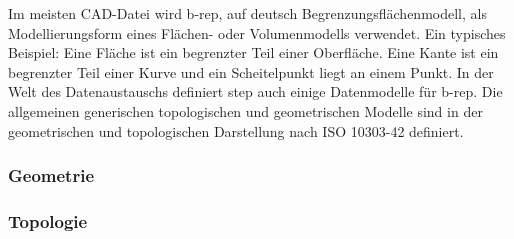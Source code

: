 \documentclass[14pt,a4paper,titlepage]{article}
\begin{document}
		\bigbreak
		Im meisten CAD-Datei wird \acf{b-rep}, auf deutsch Begrenzungsflächenmodell, als Modellierungsform eines Flächen- oder Volumenmodells verwendet. Ein typisches Beispiel: Eine Fläche ist ein begrenzter Teil einer Oberfläche. Eine Kante ist ein begrenzter Teil einer Kurve und ein Scheitelpunkt liegt an einem Punkt. In der Welt des Datenaustauschs definiert \acf{step} auch einige Datenmodelle für \acs{b-rep}. Die allgemeinen generischen topologischen und geometrischen Modelle sind in der geometrischen und topologischen Darstellung nach ISO 10303-42 definiert.\cite{b-rep}
		    
	\subsubsection{Geometrie}
	\subsubsection{Topologie}
\end{document}
